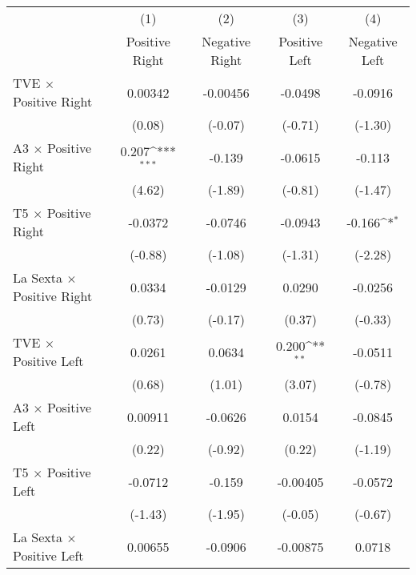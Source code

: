 {
\def\sym#1{\ifmmode^{#1}\else\(^{#1}\)\fi}
\begin{tabular}{l*{4}{c}}
\hline\hline
                &\multicolumn{1}{c}{(1)}&\multicolumn{1}{c}{(2)}&\multicolumn{1}{c}{(3)}&\multicolumn{1}{c}{(4)}\\
                &\multicolumn{1}{c}{Positive Right }&\multicolumn{1}{c}{Negative Right }&\multicolumn{1}{c}{Positive Left }&\multicolumn{1}{c}{Negative Left }\\
\hline
TVE $\times$ Positive Right&  0.00342         & -0.00456         &  -0.0498         &  -0.0916         \\
                &   (0.08)         &  (-0.07)         &  (-0.71)         &  (-1.30)         \\
A3 $\times$ Positive Right&    0.207\sym{***}&   -0.139         &  -0.0615         &   -0.113         \\
                &   (4.62)         &  (-1.89)         &  (-0.81)         &  (-1.47)         \\
T5 $\times$ Positive Right&  -0.0372         &  -0.0746         &  -0.0943         &   -0.166\sym{*}  \\
                &  (-0.88)         &  (-1.08)         &  (-1.31)         &  (-2.28)         \\
La Sexta $\times$ Positive Right&   0.0334         &  -0.0129         &   0.0290         &  -0.0256         \\
                &   (0.73)         &  (-0.17)         &   (0.37)         &  (-0.33)         \\
TVE $\times$ Positive Left&   0.0261         &   0.0634         &    0.200\sym{**} &  -0.0511         \\
                &   (0.68)         &   (1.01)         &   (3.07)         &  (-0.78)         \\
A3 $\times$ Positive Left&  0.00911         &  -0.0626         &   0.0154         &  -0.0845         \\
                &   (0.22)         &  (-0.92)         &   (0.22)         &  (-1.19)         \\
T5 $\times$ Positive Left&  -0.0712         &   -0.159         & -0.00405         &  -0.0572         \\
                &  (-1.43)         &  (-1.95)         &  (-0.05)         &  (-0.67)         \\
La Sexta $\times$ Positive Left&  0.00655         &  -0.0906         & -0.00875         &   0.0718         \\

\end{tabular}}
